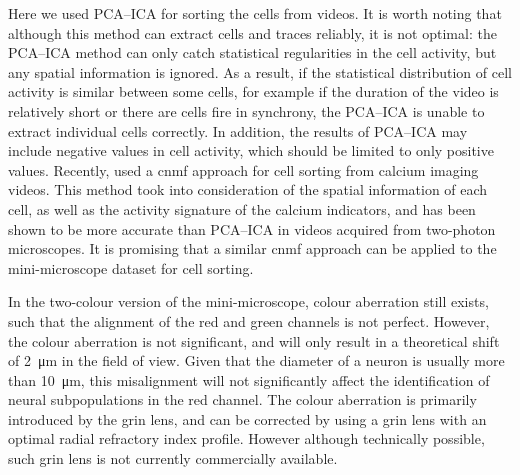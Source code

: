 Here we used PCA--ICA for sorting the cells from videos. It is worth noting that although this method can extract cells and traces reliably, it is not optimal: the PCA--ICA method can only catch statistical regularities in the cell activity, but any spatial information is ignored. As a result, if the statistical distribution of cell activity is similar between some cells, for example if the duration of the video is relatively short or there are cells fire in synchrony, the PCA--ICA is unable to extract individual cells correctly. In addition, the results of PCA--ICA may include negative values in cell activity, which should be limited to only positive values. Recently, \citet{pnevmatikakis16} used a \gls{cnmf} approach for cell sorting from calcium imaging videos. This method took into consideration of the spatial information of each cell, as well as the activity signature of the calcium indicators, and has been shown to be more accurate than PCA--ICA in videos acquired from two-photon microscopes. It is promising that a similar \gls{cnmf} approach can be applied to the mini-microscope dataset for cell sorting. 

In the two-colour version of the mini-microscope, colour aberration still exists, such that the alignment of the red and green channels is not perfect. However, the colour aberration is not significant, and will only result in a theoretical shift of \SI{2}{\um} in the field of view. Given that the diameter of a neuron is usually more than \SI{10}{\um}, this misalignment will not significantly affect the identification of neural subpopulations in the red channel. The colour aberration is primarily introduced by the \gls{grin} lens, and can be corrected by using a \gls{grin} lens with an optimal radial refractory index profile. However although technically possible, such \gls{grin} lens is not currently commercially available. 


